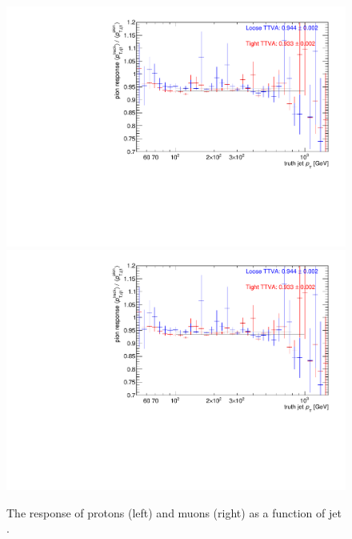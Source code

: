 \begin{figure}
\centering
\includegraphics[scale=0.3, page=3]{figures/jet_comp_study_powheg_Tight_MultiplicityFraction_withLooseandTight.pdf}
\includegraphics[scale=0.3, page=4]{figures/jet_comp_study_powheg_Tight_MultiplicityFraction_withLooseandTight.pdf}
\caption {The response of protons (left) and  muons (right) as a function of jet \pT.}
\label{fig:response proton and muon}
\end{figure}

